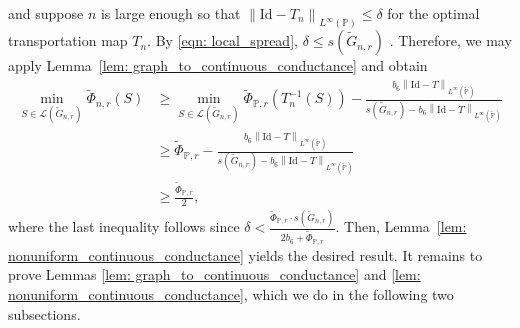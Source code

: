 \documentclass[11pt,twoside]{article}
\theoremstyle{definition}
\newcommand{\norm}[1]{\left\lVert#1\right\rVert}
\newcommand{\1}{\mathbbm{1}}
\newcommand{\Pbb}{\mathbb{P}}
\begin{document}
and suppose $n$ is large enough so that $\norm{\mathrm{Id} - T_n}_{L^{\infty}(\Pbb)} \leq \delta$ for the optimal transportation map $T_n$.
By \eqref{eqn: local_spread}, $\delta \leq s(\widetilde{G}_{n,r})$ . Therefore, we may apply Lemma~\ref{lem: graph_to_continuous_conductance} and obtain
\begin{align*}
\min_{S \in \mathcal{L}(\widetilde{G}_{n,r})} \widetilde{\Phi}_{n,r}(S) & \geq \min_{S \in \mathcal{L}(\widetilde{G}_{n,r})} \widetilde{\Phi}_{\Pbb,r}(T_n^{-1}(S)) - \frac{b_6 \norm{\mathrm{Id} - T}_{L^{\infty}(\widetilde{\Pbb})} }{s(\widetilde{G}_{n,r}) - b_6\norm{\mathrm{Id} - T}_{L^{\infty}(\widetilde{\Pbb})}} \\
& \geq  \widetilde{\Phi}_{\Pbb,r} -  \frac{b_6 \norm{\mathrm{Id} - T}_{L^{\infty}(\widetilde{\Pbb})} }{s(\widetilde{G}_{n,r}) - b_6\norm{\mathrm{Id} - T}_{L^{\infty}(\widetilde{\Pbb})}} \\
& \geq \frac{\widetilde{\Phi}_{\Pbb,r}}{2},
\end{align*}
where the last inequality follows since $\delta < \frac{\widetilde{\Phi}_{\Pbb,r}\cdot s(\widetilde{G}_{n,r})}{2b_6 + \widetilde{\Phi}_{\Pbb,r}}$. Then, Lemma~\ref{lem: nonuniform_continuous_conductance} yields the desired result. It remains to prove Lemmas \ref{lem: graph_to_continuous_conductance} and \ref{lem: nonuniform_continuous_conductance}, which we do in the following two subsections.
\end{document}
